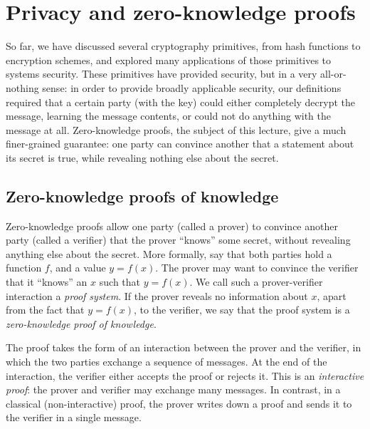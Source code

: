 \chapter{Privacy and zero-knowledge proofs}

So far, we have discussed several cryptography primitives, from hash
functions to encryption schemes, and explored many applications of those
primitives to systems security.  These primitives have provided security,
but in a very all-or-nothing sense: in order to provide broadly applicable
security, our definitions required that a certain party (with the key)
could either completely decrypt the message, learning the message
contents, or could not do anything with the message at all.
Zero-knowledge proofs, the subject of this lecture, give a much
finer-grained guarantee: one party can convince another that a
statement about its secret is true, while revealing nothing else
about the secret.

\section{Zero-knowledge proofs of knowledge}

Zero-knowledge proofs allow one party (called a prover) to convince
another party (called a verifier) that the prover ``knows'' some secret,
without revealing anything else about the secret.
More formally, say that both parties hold a function $f$, and a value $y = f(x)$.
The prover may want to convince the verifier that it ``knows'' an $x$ such that
$y=f(x)$.
We call such a prover-verifier interaction a \emph{proof system}.
If the prover reveals no information about $x$, apart from the fact that $y=f(x)$,
to the verifier, we say that the proof system is a \emph{zero-knowledge proof of knowledge}.

The proof takes the form of an interaction
between the prover and the verifier, in which
the two parties exchange a sequence of messages.
At the end of the interaction, the verifier either
accepts the proof or rejects it.
This is an \emph{interactive proof}: the prover and
verifier may exchange many messages.
In contrast, in a classical (non-interactive) proof,
the prover writes down a proof and sends it to the verifier in a single message.

